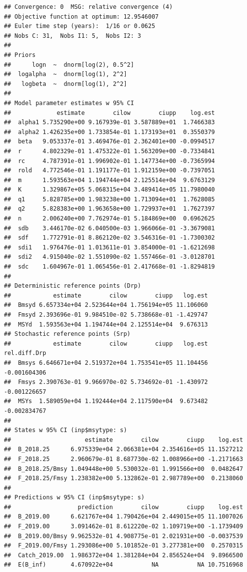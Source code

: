 \documentclass[
]{article}
\begin{document}
\begin{verbatim}
## Convergence: 0  MSG: relative convergence (4)
## Objective function at optimum: 12.9546007
## Euler time step (years):  1/16 or 0.0625
## Nobs C: 31,  Nobs I1: 5,  Nobs I2: 3
## 
## Priors
##      logn  ~  dnorm[log(2), 0.5^2]
##  logalpha  ~  dnorm[log(1), 2^2]
##   logbeta  ~  dnorm[log(1), 2^2]
## 
## Model parameter estimates w 95% CI 
##             estimate        cilow        ciupp    log.est  
##  alpha1 5.735290e+00 9.167939e-01 3.587889e+01  1.7466383  
##  alpha2 1.426235e+00 1.733854e-01 1.173193e+01  0.3550379  
##  beta   9.053337e-01 3.469476e-01 2.362401e+00 -0.0994517  
##  r      4.802329e-01 1.475322e-01 1.563209e+00 -0.7334841  
##  rc     4.787391e-01 1.996902e-01 1.147734e+00 -0.7365994  
##  rold   4.772546e-01 1.191177e-01 1.912159e+00 -0.7397051  
##  m      1.593563e+04 1.194744e+04 2.125514e+04  9.6763129  
##  K      1.329867e+05 5.068315e+04 3.489414e+05 11.7980040  
##  q1     5.828785e+00 1.983238e+00 1.713094e+01  1.7628085  
##  q2     5.828383e+00 1.963658e+00 1.729937e+01  1.7627397  
##  n      2.006240e+00 7.762974e-01 5.184869e+00  0.6962625  
##  sdb    3.446170e-02 6.040500e-03 1.966066e-01 -3.3679081  
##  sdf    1.772791e-01 8.862120e-02 3.546316e-01 -1.7300302  
##  sdi1   1.976476e-01 1.013611e-01 3.854000e-01 -1.6212698  
##  sdi2   4.915040e-02 1.551090e-02 1.557466e-01 -3.0128701  
##  sdc    1.604967e-01 1.065456e-01 2.417668e-01 -1.8294819  
##  
## Deterministic reference points (Drp)
##            estimate        cilow        ciupp   log.est  
##  Bmsyd 6.657334e+04 2.523644e+04 1.756194e+05 11.106060  
##  Fmsyd 2.393696e-01 9.984510e-02 5.738668e-01 -1.429747  
##  MSYd  1.593563e+04 1.194744e+04 2.125514e+04  9.676313  
## Stochastic reference points (Srp)
##            estimate        cilow        ciupp   log.est rel.diff.Drp  
##  Bmsys 6.646671e+04 2.519372e+04 1.753541e+05 11.104456 -0.001604306  
##  Fmsys 2.390763e-01 9.966970e-02 5.734692e-01 -1.430972 -0.001226657  
##  MSYs  1.589059e+04 1.192444e+04 2.117590e+04  9.673482 -0.002834767  
## 
## States w 95% CI (inp$msytype: s)
##                     estimate        cilow        ciupp    log.est  
##  B_2018.25      6.975339e+04 2.066381e+04 2.354616e+05 11.1527212  
##  F_2018.25      2.960679e-01 8.687730e-02 1.008966e+00 -1.2171663  
##  B_2018.25/Bmsy 1.049448e+00 5.530032e-01 1.991566e+00  0.0482647  
##  F_2018.25/Fmsy 1.238382e+00 5.132862e-01 2.987789e+00  0.2138060  
## 
## Predictions w 95% CI (inp$msytype: s)
##                   prediction        cilow        ciupp    log.est  
##  B_2019.00      6.621767e+04 1.790426e+04 2.449015e+05 11.1007026  
##  F_2019.00      3.091462e-01 8.612220e-02 1.109719e+00 -1.1739409  
##  B_2019.00/Bmsy 9.962532e-01 4.908775e-01 2.021931e+00 -0.0037539  
##  F_2019.00/Fmsy 1.293086e+00 5.101852e-01 3.277381e+00  0.2570315  
##  Catch_2019.00  1.986372e+04 1.381284e+04 2.856524e+04  9.8966500  
##  E(B_inf)       4.670922e+04           NA           NA 10.7516968
\end{verbatim}
\end{document}
